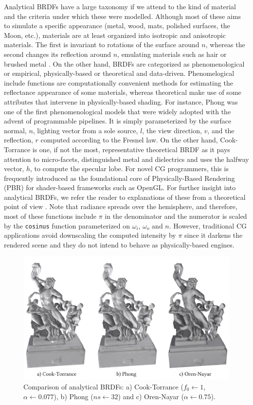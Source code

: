 Analytical BRDFs have a large taxonomy if we attend to the kind of material and the criteria under which these were modelled. Although most of these aims to simulate a specific appearance (metal, wood, mats, polished surfaces, the Moon, etc.), materials are at least organized into isotropic and anisotropic materials. The first is invariant to rotations of the surface around $n$, whereas the second changes its reflection around $n$, emulating materials such as hair or brushed metal \cite{guarnera_brdf_2016}. On the other hand, BRDFs are categorized as phenomenological or empirical, physically-based or theoretical and data-driven. Phenomelogical include functions are computationally convenient methods for estimating the reflectance appearance of some materials, whereas theoretical make use of some attributes that intervene in physically-based shading. For instance, Phong was one of the first phenomenological models that were widely adopted with the advent of programmable pipelines. It is simply parameterized by the surface normal, $n$, lighting vector from a sole source, $l$, the view direction, $v$, and the reflection, $r$ computed according to the Fresnel law. On the other hand, Cook-Torrance is one, if not the most, representative theoretical BRDF as it pays attention to micro-facets, distinguished metal and dielectrics and uses the halfway vector, $h$, to compute the specular lobe. For novel CG programmers, this is frequently introduced as the foundational core of Physically-Based Rendering (PBR) for shader-based frameworks such as OpenGL. For further insight into analytical BRDFs, we refer the reader to explanations of these from a theoretical point of view \cite{guarnera_brdf_2016, soldado_overview_2012}. Note that radiance spreads over the hemisphere, and therefore, most of these functions include $\pi$ in the denominator and the numerator is scaled by the \verb|cosinus| function parameterized on $\omega_i$, $\omega_o$ and $n$. However, traditional CG applications avoid downscaling the computed intensity by $\pi$ since it darkens the rendered scene and they do not intend to behave as physically-based engines. 

\begin{figure}[!ht]
	\includegraphics[width=\textwidth]{figs/fundamentals/analytical_brdf.png}
	\caption{Comparison of analytical BRDFs: a) Cook-Torrance ($f_0 \gets 1$, $\alpha \gets 0.077$), b) Phong ($ns \gets 32$) and c) Oren-Nayar ($\alpha \gets 0.75$). }
    \label{fig:analytical_brdf}
\end{figure}

